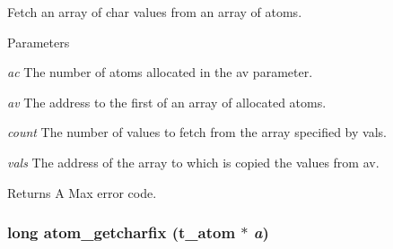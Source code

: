 Fetch an array of char values from an array of atoms. 
\begin{DoxyParams}{Parameters}
\item[{\em ac}]The number of atoms allocated in the av parameter. \item[{\em av}]The address to the first of an array of allocated atoms. \item[{\em count}]The number of values to fetch from the array specified by vals. \item[{\em vals}]The address of the array to which is copied the values from av. \end{DoxyParams}
\begin{DoxyReturn}{Returns}
A Max error code. 
\end{DoxyReturn}
\hypertarget{group__atom_gae9bef849142b12c94f842faa03b3238c}{
\subsubsection[{atom\_\-getcharfix}]{\setlength{\rightskip}{0pt plus 5cm}long atom\_\-getcharfix ({\bf t\_\-atom} $\ast$ {\em a})}}
\label{group__atom_gae9bef849142b12c94f842faa03b3238c}


